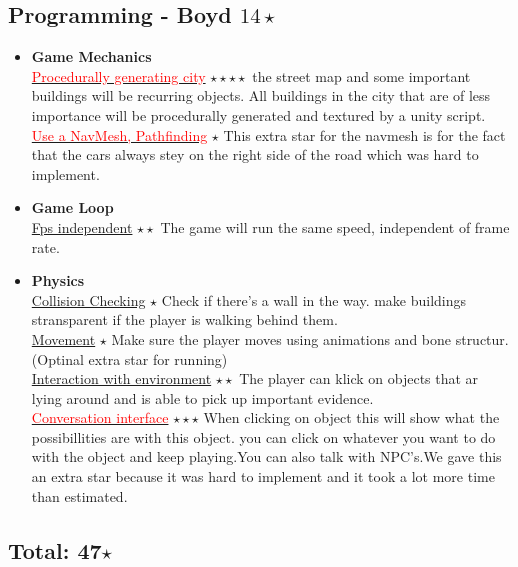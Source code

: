 \documentclass{article}
\begin{document}
		\subsection{Programming - Boyd $14 \star$}
			\begin{itemize}
				\item \textbf{Game Mechanics}\\
					\underline {\textcolor{red}{Procedurally generating city}} $\star \star \star \star$  the street map and some important buildings will be recurring objects. All buildings in the city that are of less importance will be procedurally generated and textured by a unity script.
				      	\underline {\textcolor{red}{Use a NavMesh, Pathfinding}} $\star$ This extra star for the navmesh is for the fact that the cars always stey on the right side of the road which was hard to implement.	

				\item \textbf{Game Loop}\\
					\underline{Fps independent} $\star \star$ The game will run the same speed, independent of frame rate.
				\item \textbf{Physics}\\
					\underline{Collision Checking} $\star$ Check if there's a wall in the way. make buildings stransparent if the player is walking behind them.\\
					\underline{Movement} $\star$ Make sure the player moves using animations and bone structur. (Optinal extra star for running)\\
					\underline{Interaction with environment} $\star \star$ The player can klick on objects that ar lying around and is able to pick up important evidence.\\
					\underline{ \textcolor{red}{Conversation interface}} $\star \star \star$ When clicking on object this will show what the possibillities are with this object. you can click on whatever you want to do with the object and keep playing.You can also talk with NPC's.We gave this an extra star because it was hard to implement and it took a lot more time than estimated.
			\end{itemize}

			\subsection*{Total: 47$\star$}

			
\end{document}
